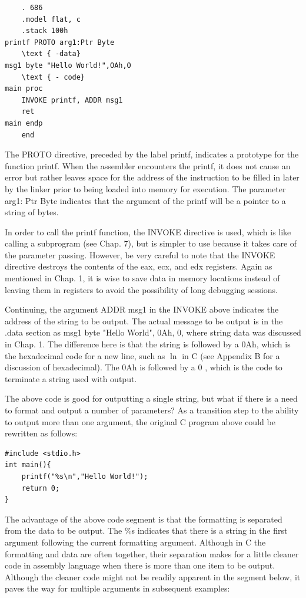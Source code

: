 \documentclass[10pt]{article}
\begin{document}
\begin{verbatim}
    . 686
    .model flat, c
    .stack 100h
printf PROTO arg1:Ptr Byte
    \text { -data}
msg1 byte "Hello World!",OAh,O
    \text { - code}
main proc
    INVOKE printf, ADDR msg1
    ret
main endp
    end
\end{verbatim}

The PROTO directive, preceded by the label printf, indicates a prototype for the function printf. When the assembler encounters the printf, it does not cause an error but rather leaves space for the address of the instruction to be filled in later by the linker prior to being loaded into memory for execution. The parameter arg1: Ptr Byte indicates that the argument of the printf will be a pointer to a string of bytes.

In order to call the printf function, the INVOKE directive is used, which is like calling a subprogram (see Chap. 7), but is simpler to use because it takes care of the parameter passing. However, be very careful to note that the INVOKE directive destroys the contents of the eax, ecx, and edx registers. Again as mentioned in Chap. 1, it is wise to save data in memory locations instead of leaving them in registers to avoid the possibility of long debugging sessions.

Continuing, the argument ADDR msg1 in the INVOKE above indicates the address of the string to be output. The actual message to be output is in the .data section as msg1 byte "Hello World", 0Ah, 0, where string data was discussed in Chap. 1. The difference here is that the string is followed by a 0Ah, which is the hexadecimal code for a new line, such as $\ln$ in C (see Appendix B for a discussion of hexadecimal). The 0Ah is followed by a 0 , which is the code to terminate a string used with output.

The above code is good for outputting a single string, but what if there is a need to format and output a number of parameters? As a transition step to the ability to output more than one argument, the original C program above could be rewritten as follows:

\begin{verbatim}
#include <stdio.h>
int main(){
    printf("%s\n","Hello World!");
    return 0;
}
\end{verbatim}

The advantage of the above code segment is that the formatting is separated from the data to be output. The \%s indicates that there is a string in the first argument following the current formatting argument. Although in C the formatting and data are often together, their separation makes for a little cleaner code in assembly language when there is more than one item to be output. Although the cleaner code might not be readily apparent in the segment below, it paves the way for multiple arguments in subsequent examples:
\end{document}

